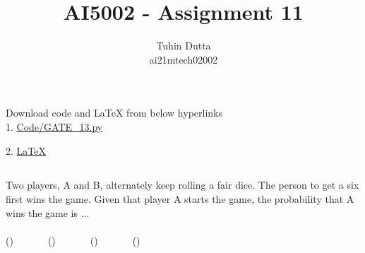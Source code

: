 \documentclass[journal,12pt,twocolumn]{IEEEtran}
\begin{document}
\providecommand{\mtx}[1]{\mathbf{#1}}
\providecommand{\fourier}{\overset{\mathcal{F}}{ \rightleftharpoons}}
\providecommand{\system}{\overset{\mathcal{H}}{ \longleftrightarrow}}
\newcommand{\solution}{\noindent \textbf{Solution: }}
\newcommand{\cosec}{\,\text{cosec}\,}
\providecommand{\dec}[2]{\ensuremath{\overset{#1}{\underset{#2}{\gtrless}}}}
\newcommand{\myvec}[1]{\ensuremath{\begin{pmatrix}#1\end{pmatrix}}}
\newcommand{\mydet}[1]{\ensuremath{\begin{vmatrix}#1\end{vmatrix}}}
\makeatletter
{}
\makeatother
\let\StandardTheFigure\thefigure
\let\vec\mathbf
\renewcommand{\thefigure}{\theproblem}
\def\putbox#1#2#3{\makebox[0in][l]{\makebox[#1][l]{}\raisebox{\baselineskip}[0in][0in]{\raisebox{#2}[0in][0in]{#3}}}}
     \def\rightbox#1{\makebox[0in][r]{#1}}
     \def\centbox#1{\makebox[0in]{#1}}
     \def\topbox#1{\raisebox{-\baselineskip}[0in][0in]{#1}}
     \def\midbox#1{\raisebox{-0.5\baselineskip}[0in][0in]{#1}}
\vspace{3cm}
\title{AI5002 - Assignment 11}
\author{Tuhin Dutta\\ ai21mtech02002}
\maketitle
\newpage
\bigskip
\renewcommand{\thefigure}{\theenumi}
\renewcommand{\thetable}{\theenumi}
\begin{mdframed}
Download code and LaTeX from below hyperlinks\\
1. \href{https://github.com/Tauhait/AI5002/blob/main/Assignment-11/Code/GATE_13.py}{Code/GATE\_13.py}


2. \href{https://github.com/Tauhait/AI5002/tree/main/Assignment-11/LaTeX}{LaTeX}
\end{mdframed}
\subsection*{}
Two players, A and B, alternately keep rolling a fair dice. The person to get a six first wins the game. Given that player A starts the game, the probability that A wins the game is ...\\
\\
()\ \ \ \ \ \ \ ()\ \ \ \ \ \ \ ()\ \ \ \ \ \ \ ()\ \ \ \ \ \ \
\end{document}
